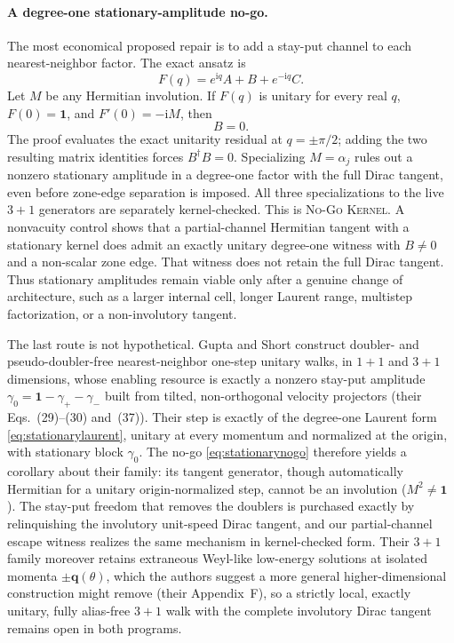 \documentclass[11pt]{article}
\newcommand{\Kernel}{\textcolor{kernelcolor}{\textsc{Kernel}}}
\newcommand{\NoGo}{\textsc{No-Go}}
\newcommand{\ii}{\mathrm{i}}
\newcommand{\id}{\mathbf{1}}
\begin{document}
\paragraph{A degree-one stationary-amplitude no-go.}
The most economical proposed repair is to add a stay-put channel to each
nearest-neighbor factor.  The exact ansatz is
\begin{equation}\label{eq:stationarylaurent}
 F(q)=e^{\ii q}A+B+e^{-\ii q}C.
\end{equation}
Let $M$ be any Hermitian involution.  If $F(q)$ is unitary for every real $q$,
$F(0)=\id$, and $F'(0)=-\ii M$, then
\begin{equation}\label{eq:stationarynogo}
 B=0.
\end{equation}
The proof evaluates the exact unitarity residual at $q=\pm\pi/2$; adding the
two resulting matrix identities forces $B^\dagger B=0$.  Specializing
$M=\alpha_j$ rules out a nonzero stationary amplitude in a degree-one factor
with the full Dirac tangent, even before zone-edge separation is imposed.
All three specializations to the live $3+1$ generators are separately
kernel-checked.  This is \NoGo{} \Kernel{}.  A nonvacuity control shows that a partial-channel
Hermitian tangent with a stationary kernel does admit an exactly unitary
degree-one witness with $B\neq0$ and a non-scalar zone edge.  That witness does
not retain the full Dirac tangent.  Thus stationary amplitudes remain viable
only after a genuine change of architecture, such as a larger internal cell,
longer Laurent range, multistep factorization, or a non-involutory tangent.

The last route is not hypothetical.  Gupta and Short
\cite{GuptaShortDoubling} construct doubler- and pseudo-doubler-free
nearest-neighbor one-step unitary walks, in $1+1$ and $3+1$ dimensions, whose
enabling resource is exactly a nonzero stay-put amplitude
$\gamma_0=\id-\gamma_+-\gamma_-$ built from tilted, non-orthogonal velocity
projectors (their Eqs.~(29)--(30) and~(37)).  Their step is exactly of the
degree-one Laurent form \eqref{eq:stationarylaurent}, unitary at every
momentum and normalized at the origin, with stationary block $\gamma_0$.
The no-go \eqref{eq:stationarynogo} therefore yields a corollary about
their family: its tangent generator, though automatically Hermitian for a
unitary origin-normalized step, cannot be an involution ($M^2
\neq\id$).
The stay-put freedom that removes the doublers is purchased
exactly by relinquishing the involutory unit-speed Dirac tangent, and our
partial-channel escape witness realizes the same mechanism in kernel-checked
form.  Their $3+1$ family moreover retains extraneous Weyl-like low-energy
solutions at isolated momenta $\pm\mathbf q(\theta)$, which the authors
suggest a more general higher-dimensional construction might remove (their
Appendix~F), so a strictly local, exactly unitary, fully alias-free $3+1$
walk with the complete involutory Dirac tangent remains open in both
programs.
\end{document}
